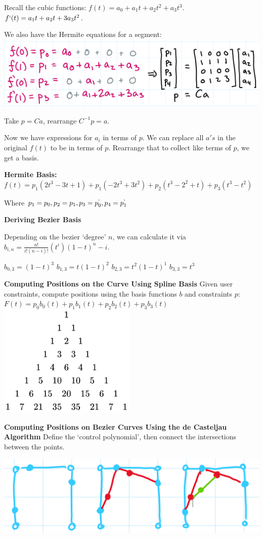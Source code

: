 \documentclass[letterpaper, 8pt]{extarticle}
\begin{document}
\begin{multicols*}{4}
    Recall the cubic functions:
    $f(t) = a_0 + a_1t + a_2t^2 + a_3t^3$.
    $f`(t) = a_1t + a_2t + 3a_3t^2$.

    We also have the Hermite equations for a segment:
    \includegraphics[width=0.8\linewidth]{
        curve-basis-soe.png}

    Take $p=Ca$, rearrange $C^{-1}p=a$.

    Now we have expressions for $a_i$ in terms of $p$. We can replace all $a's$ in the original $f(t)$ to be in terms of $p$. Rearrange that to collect like terms of $p$, we get a basis.


    \textbf{Hermite Basis:}
    $f(t) = p_1(2t^3 - 3t + 1) + p_1(-2t^3+3t^2) + p_2(t^3-2^2 + t) + p_3(t^3-t^2)$

    Where $p_1 = p_0, p_2 = p_1, p_3 = p^`_0, p_4 = p^`_1$

    \textbf{Deriving Bezier Basis}

    Depending on the bezier `degree' $n$, we can calculate it via $b_{i,n} = \frac{n!}{i!(n-i)!}(t^i)(1-t)^n-i$.

    $b_{0,3} = (1-t)^3$
    $b_{1,3} = t(1-t)^2$
    $b_{2,3} = t^2(1-t)^1$
    $b_{3,3} = t^3$


    \textbf{Computing Positions on the Curve Using Spline Basis}
    Given user constraints, compute positions using the basis functions $b$ and constraints $p$: $F(t) = p_0b_0(t) + p_1b_1(t) + p_2b_2(t) + p_3b_3(t)$
    \includegraphics[width=0.5\linewidth]{pascal.png}

    \textbf{Computing Positions on Bezier Curves Using the de Casteljau Algorithm}
    Define the `control polynomial', then connect the intersections between the points.
    
    \includegraphics[width=0.5\linewidth]{bezier.png}
    


\end{multicols*}
\end{document}
